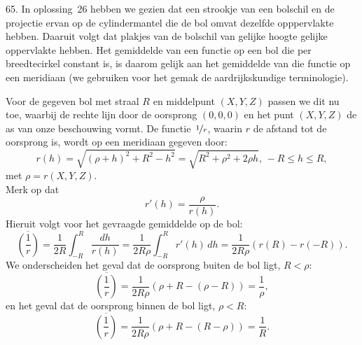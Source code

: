 \begin{problem}{65.}
	In oplossing~26 hebben we gezien dat een strookje van een bol\-schil en de projectie ervan op de cylindermantel die de bol omvat dezelfde opppervlakte hebben. Daaruit volgt dat plakjes van de bol\-schil van gelijke hoogte gelijke oppervlakte hebben. Het gemiddelde van een functie op een bol die per breedtecirkel constant is, is daarom gelijk aan het gemiddelde van die functie op een meridiaan (we gebrui\-ken voor het gemak de aardrijkskundige terminologie).

    Voor de gegeven bol met straal $R$ en middelpunt $(X,Y,Z)$ passen we dit nu toe, waarbij de rechte lijn door de oorsprong $(0,0,0)$ en het punt $(X,Y,Z)$ de as van onze beschouwing vormt. De functie~$\nicefrac{1}{r}$, waarin $r$ de afstand tot de oorsprong is, wordt op een meridiaan gegeven door:
    \begin{equation*}
        r(h) = \sqrt{(\rho + h)^2 + R^2 - h^2} = \sqrt{R^2 + \rho^2 + 2 \rho h},\, -R \leq h \leq R,
    \end{equation*}
    met $\rho = r(X,Y,Z)$.\\
    Merk op dat
    \begin{equation*}
        r'(h) = \frac{\rho}{r(h)}.
    \end{equation*}
    Hieruit volgt voor het gevraagde gemiddelde op de bol:
    \begin{equation*}
        \overline{\left( \frac{1}{r} \right)} = \frac{1}{2 R} \int_{-R}^{R} \frac{dh}{r(h)} = \frac{1}{2 R \rho} \int_{-R}^{R} r'(h) \,dh = \frac{1}{2 R \rho} (r(R) - r(-R)).
    \end{equation*}
    We onderscheiden het geval dat de oorsprong buiten de bol ligt, $R < \rho$:
    \begin{equation*}
        \overline{\left( \frac{1}{r} \right)} = \frac{1}{2 R \rho} (\rho + R - (\rho - R)) = \frac{1}{\rho},
    \end{equation*}
    en het geval dat de oorsprong binnen de bol ligt, $\rho < R$:
    \begin{equation*}
        \overline{\left( \frac{1}{r} \right)} = \frac{1}{2 R \rho} (\rho + R - (R - \rho)) = \frac{1}{R}.
    \end{equation*}
\end{problem}

\clearpage

